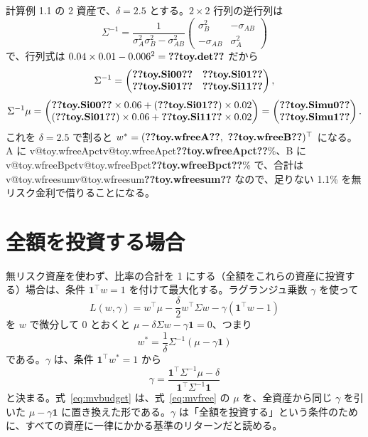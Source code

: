\documentclass[xelatex,ja=standard,jafont=hiragino-pron,a4paper,11pt,openany]{bxjsreport}
\makeatletter
\newcommand{\V}[1]{\ifcsname v@#1\endcsname\csname v@#1\endcsname\else\textbf{??#1??}\fi}
\newcommand{\T}{^{\top}}
\newcommand{\one}{\mathbf{1}}
\makeatother
\begin{document}
\begin{exbox}
計算例 1.1 の 2 資産で、$\delta = 2.5$ とする。$2 \times 2$ 行列の逆行列は
\[
\Sigma^{-1} = \frac{1}{\sigma_A^2\sigma_B^2 - \sigma_{AB}^2}
\begin{pmatrix} \sigma_B^2 & -\sigma_{AB} \\ -\sigma_{AB} & \sigma_A^2 \end{pmatrix}
\]
で、行列式は $0.04 \times 0.01 - 0.006^2 = \V{toy.det}$ だから
\[
\Sigma^{-1} = \begin{pmatrix} \V{toy.Si00} & \V{toy.Si01} \\ \V{toy.Si01} & \V{toy.Si11} \end{pmatrix},
\]
\[
\Sigma^{-1}\mu = \begin{pmatrix} \V{toy.Si00} \times 0.06 + (\V{toy.Si01}) \times 0.02 \\ (\V{toy.Si01}) \times 0.06 + \V{toy.Si11} \times 0.02 \end{pmatrix}
= \begin{pmatrix} \V{toy.Simu0} \\ \V{toy.Simu1} \end{pmatrix}.
\]
これを $\delta = 2.5$ で割ると $w^* = (\V{toy.wfreeA},\ \V{toy.wfreeB})\T$ になる。A に \V{toy.wfreeApct}\%、B に \V{toy.wfreeBpct}\% で、合計は \V{toy.wfreesum} なので、足りない 1.1\% を無リスク金利で借りることになる。
\end{exbox}

\section{全額を投資する場合}

無リスク資産を使わず、比率の合計を 1 にする（全額をこれらの資産に投資する）場合は、条件 $\one\T w = 1$ を付けて最大化する。ラグランジュ乗数 $\gamma$ を使って
\[
L(w, \gamma) = w\T\mu - \frac{\delta}{2} w\T\Sigma w - \gamma(\one\T w - 1)
\]
を $w$ で微分して 0 とおくと $\mu - \delta\Sigma w - \gamma\one = 0$、つまり
\begin{equation}
w^* = \frac{1}{\delta}\Sigma^{-1}(\mu - \gamma\one)
\label{eq:mvbudget}
\end{equation}
である。$\gamma$ は、条件 $\one\T w^* = 1$ から
\begin{equation}
\gamma = \frac{\one\T\Sigma^{-1}\mu - \delta}{\one\T\Sigma^{-1}\one}
\label{eq:gamma}
\end{equation}
と決まる。式~\eqref{eq:mvbudget} は、式~\eqref{eq:mvfree} の $\mu$ を、全資産から同じ $\gamma$ を引いた $\mu - \gamma\one$ に置き換えた形である。$\gamma$ は「全額を投資する」という条件のために、すべての資産に一律にかかる基準のリターンだと読める。
\end{document}
